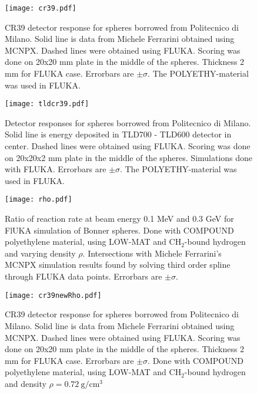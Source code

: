 \documentclass[a4paper,10pt]{article}
\date{\today}
\begin{document}
\begin{figure}
\centering
\texttt{[image: cr39.pdf]}
\caption
{CR39 detector response for spheres borrowed from Politecnico di Milano. Solid line is data from Michele Ferrarini obtained using MCNPX. Dashed lines were obtained using FLUKA. Scoring was done on 20x20 mm plate in the middle of the spheres. Thickness 2 mm for FLUKA case. Errorbars are $\pm\sigma$. The POLYETHY-material was used in FLUKA.}\label{1}
\end{figure}

\begin{figure}
\centering
\texttt{[image: tldcr39.pdf]}
\caption
{Detector responses for spheres borrowed from Politecnico di Milano. Solid line is energy deposited in TLD700 - TLD600 detector in center. Dashed lines were obtained using FLUKA. Scoring was done on 20x20x2 mm plate in the middle of the spheres. Simulations done with FLUKA. Errorbars are $\pm\sigma$. The POLYETHY-material was used in FLUKA.}\label{2}
\end{figure}

\begin{figure}
\centering
\texttt{[image: rho.pdf]}
\caption
{Ratio of reaction rate at beam energy 0.1 MeV and 0.3 GeV for FlUKA simulation of Bonner spheres. Done with COMPOUND polyethylene material, using LOW-MAT and $\mathrm{CH}_2$-bound hydrogen and varying density $\rho$. Intersections with Michele Ferrarini's MCNPX simulation results found by solving third order spline through FLUKA data points. Errorbars are $\pm\sigma$. }\label{rho}
\end{figure}

\begin{figure}
\centering
\texttt{[image: cr39newRho.pdf]}
\caption
{CR39 detector response for spheres borrowed from Politecnico di Milano. Solid line is data from Michele Ferrarini obtained using MCNPX. Dashed lines were obtained using FLUKA. Scoring was done on 20x20 mm plate in the middle of the spheres. Thickness 2 mm for FLUKA case. Errorbars are $\pm\sigma$. Done with COMPOUND polyethylene material, using LOW-MAT and $\mathrm{CH}_2$-bound hydrogen and density $\rho=0.72\ \mathrm{g}/\mathrm{cm}^3$}\label{1}
\end{figure}
\end{document}

